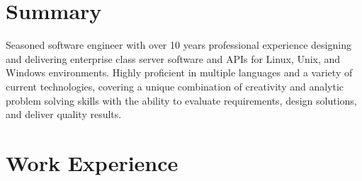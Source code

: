 \documentclass[11pt,letterpaper,roman]{moderncv} %
\begin{document}









\makecvtitle %


\section{Summary}

	\cvitem{}
	{
		Seasoned software engineer with over 10 years professional experience designing and delivering enterprise class server software and APIs for Linux, Unix, and Windows environments.  Highly proficient in multiple languages and a variety of current	technologies, covering a unique combination of creativity and analytic problem solving skills with the ability to evaluate requirements, design solutions, and deliver quality	results.
	}


\section{Work Experience}
\end{document}
